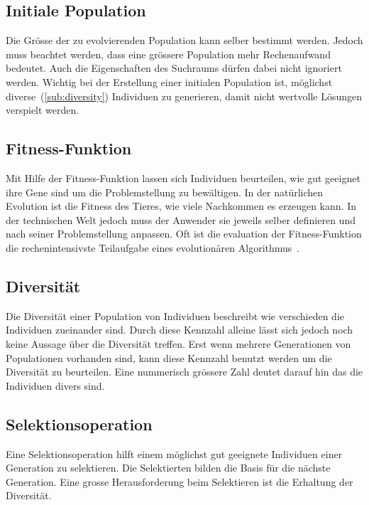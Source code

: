     \subsection{Initiale Population}
      Die Grösse der zu evolvierenden Population kann selber bestimmt werden.
      Jedoch muss beachtet werden, dass eine grössere Population mehr Rechenaufwand bedeutet.
      Auch die Eigenschaften des Suchraums dürfen dabei nicht ignoriert werden.
      Wichtig bei der Erstellung einer initialen Population ist, möglichst diverse~(\vref{sub:diversity}) Individuen zu generieren,
      damit nicht wertvolle Lösungen verspielt werden.

    \subsection{Fitness-Funktion}

      Mit Hilfe der Fitness-Funktion lassen sich Individuen beurteilen,
      wie gut geeignet ihre Gene sind um die Problemstellung zu bewältigen.
      In der natürlichen Evolution ist die Fitness des Tieres, wie viele Nachkommen es erzeugen kann.
      In der technischen Welt jedoch muss der Anwender sie jeweils selber definieren und
      nach seiner Problemstellung anpassen. Oft ist die evaluation der Fitness-Funktion
      die rechenintensivste Teilaufgabe eines evolutionären Algorithmus~\cite[S.22]{book:bioInspired}.

    \subsection{Diversität\label{sub:diversity}}
      Die Diversität einer Population von Individuen beschreibt wie verschieden die Individuen zueinander sind.
      Durch diese Kennzahl alleine lässt sich jedoch noch keine Aussage über die Diversität treffen.
      Erst wenn mehrere Generationen von Populationen vorhanden sind, kann diese Kennzahl benutzt werden um die Diversität zu beurteilen.
      Eine nummerisch grössere Zahl deutet darauf hin das die Individuen divers sind.



    \subsection{Selektionsoperation}

      Eine Selektionsoperation hilft einem möglichst gut geeignete Individuen einer Generation zu selektieren.
      Die Selektierten bilden die Basis für die nächste Generation.
      Eine grosse Herausforderung beim Selektieren ist die Erhaltung der Diversität.

